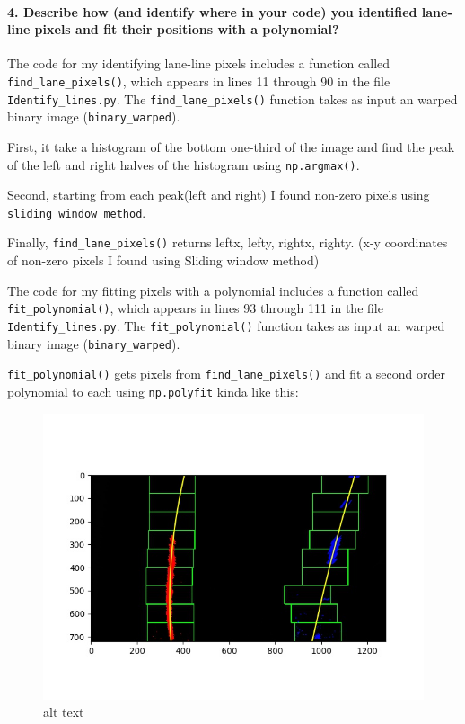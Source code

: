 \documentclass[11pt]{article}
\makeatletter
\def\maxwidth{\ifdim\Gin@nat@width>\linewidth\linewidth
    \else\Gin@nat@width\fi}
\let\Oldincludegraphics\includegraphics
\renewcommand{\includegraphics}[1]{\Oldincludegraphics[width=.8\maxwidth]{#1}}
\makeatother
\begin{document}
\paragraph{4. Describe how (and identify where in your code) you
identified lane-line pixels and fit their positions with a
polynomial?}\label{describe-how-and-identify-where-in-your-code-you-identified-lane-line-pixels-and-fit-their-positions-with-a-polynomial}

The code for my identifying lane-line pixels includes a function called
\texttt{find\_lane\_pixels()}, which appears in lines 11 through 90 in
the file \texttt{Identify\_lines.py}. The \texttt{find\_lane\_pixels()}
function takes as input an warped binary image
(\texttt{binary\_warped}).

First, it take a histogram of the bottom one-third of the image and find
the peak of the left and right halves of the histogram using
\texttt{np.argmax()}.

Second, starting from each peak(left and right) I found non-zero pixels
using \texttt{sliding\ window\ method}.

Finally, \texttt{find\_lane\_pixels()} returns leftx, lefty, rightx,
righty. (x-y coordinates of non-zero pixels I found using Sliding window
method)

The code for my fitting pixels with a polynomial includes a function
called \texttt{fit\_polynomial()}, which appears in lines 93 through 111
in the file \texttt{Identify\_lines.py}. The \texttt{fit\_polynomial()}
function takes as input an warped binary image
(\texttt{binary\_warped}).

\texttt{fit\_polynomial()} gets pixels from
\texttt{find\_lane\_pixels()} and fit a second order polynomial to each
using \texttt{np.polyfit} kinda like this:

\begin{figure}
\centering
\includegraphics{./output_images/general_sliding_window/lines_Identified_test1.jpg}
\caption{alt text}
\end{figure}
\end{document}
